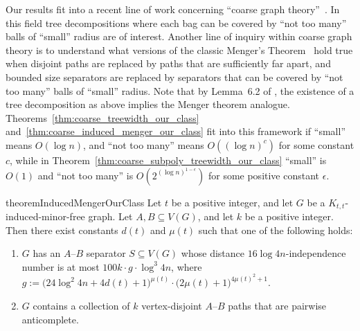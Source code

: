 
Our results fit into a recent line of work concerning ``coarse graph theory''~\cite{Agelos, nguyen2025asymptoticstructureicoarse, gartland2023inducedversionsmengerstheorem, Hendrey_2024, Albrechtsen_2024, nguyen2025counterexamplecoarsemengerconjecture}.
In this field tree decompositions where each bag can be covered by 
``not too many'' balls of ``small'' radius are of interest. Another line of inquiry within coarse graph theory is to understand what versions of the classic Menger's Theorem~\cite{Menger} hold true when disjoint paths are replaced by paths that are sufficiently far apart, and bounded size separators are replaced by separators that can be covered by ``not too many'' balls of ``small'' radius.  Note that by
Lemma~6.2 of \cite{subpolynomialtreewidth}, the existence of  a tree decomposition as above implies the Menger theorem analogue. 
%
Theorems~\ref{thm:coarse_treewidth_our_class} and~\ref{thm:coarse_induced_menger_our_class} fit into this framework
if ``small'' means $O(\log n)$, and ``not too many'' means $O((\log n)^c)$ for some constant $c$, while in 
Theorem~\ref{thm:coarse_subpoly_treewidth_our_class} 
``small'' is $O(1)$ and ``not too many'' is $O(2^{(\log n)^{1-\epsilon}})$ for some positive constant $\epsilon$.  
%

% 


\begin{restatable}{theorem}{InducedMengerOurClass}\label{thm:coarse_induced_menger_our_class}
    Let $t$ be a positive integer, and let $G$ be a $K_{t,t}$-induced-minor-free graph. Let $A,B \subseteq V(G)$, and let $k$ be a positive integer. Then there exist constants $d(t)$ and $\mu(t)$ such that one of the following holds:
    \begin{enumerate}
        \item $G$ has an $A$--$B$ separator $S \subseteq V(G)$ whose distance $16\log 4n$-independence number is at most $100k \cdot g \cdot \log^3 4n$, where $g := \bigl(24\log^2 4n + 4d(t) + 1\bigr)^{\mu(t)} \cdot \bigl(2\mu(t)+1\bigr)^{4\mu(t)^2+1}$.
        \item $G$ contains a collection of $k$ vertex-disjoint $A$--$B$ paths that are pairwise anticomplete.
    \end{enumerate}
\end{restatable}


